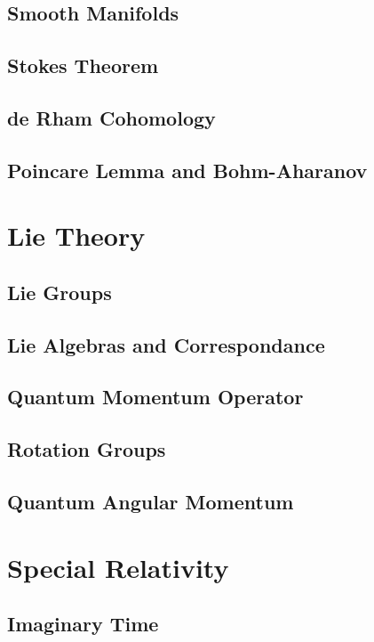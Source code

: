 \documentclass[12pt]{article}
\theoremstyle{definition}
\theoremstyle{remark}
\theoremstyle{example}
\begin{document}
\subsection{Smooth Manifolds}

\subsection{Stokes Theorem}

\subsection{de Rham Cohomology}

\subsection{Poincare Lemma and Bohm-Aharanov}

\section{Lie Theory}

\subsection{Lie Groups}

\subsection{Lie Algebras and Correspondance}

\subsection{Quantum Momentum Operator}

\subsection{Rotation Groups}

\subsection{Quantum Angular Momentum}

\section{Special Relativity}

\subsection{Imaginary Time}
\end{document}
